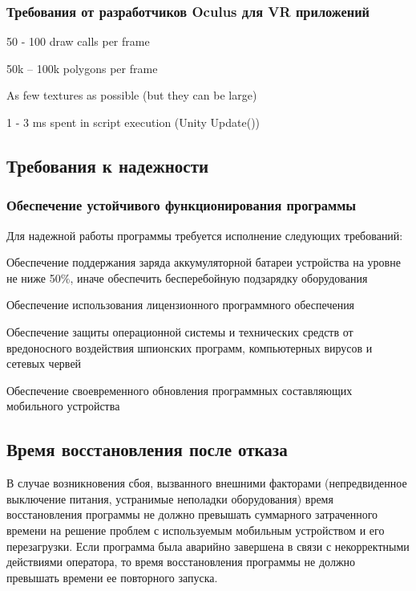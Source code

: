 \subsubsection{Требования от разработчиков Oculus для VR приложений}
\begin{my_enumerate}
\item 50 - 100 draw calls per frame
\item 50k – 100k polygons per frame
\item As few textures as possible (but they can be large)
\item 1 - 3 ms spent in script execution (Unity Update())
\end{my_enumerate}


\subsection{Требования к надежности}
\subsubsection{Обеспечение устойчивого функционирования программы}
Для надежной работы программы требуется исполнение следующих требований:
\begin{my_enumerate}
\item Обеспечение поддержания заряда аккумуляторной батареи устройства на уровне не ниже 50\%, иначе обеспечить бесперебойную подзарядку оборудования
\item Обеспечение использования лицензионного программного обеспечения
\item Обеспечение защиты операционной системы и технических средств от вредоносного воздействия шпионских программ, компьютерных вирусов и сетевых червей
\item Обеспечение своевременного обновления программных составляющих мобильного устройства
\end{my_enumerate}


\subsection{Время восстановления после отказа}
В случае возникновения сбоя, вызванного внешними факторами (непредвиденное выключение питания, устранимые неполадки оборудования) время восстановления программы не должно превышать суммарного затраченного времени на решение проблем с используемым мобильным устройством и его перезагрузки. Если программа была аварийно завершена в связи с некорректными действиями оператора, то время восстановления программы не должно превышать времени ее повторного запуска.

